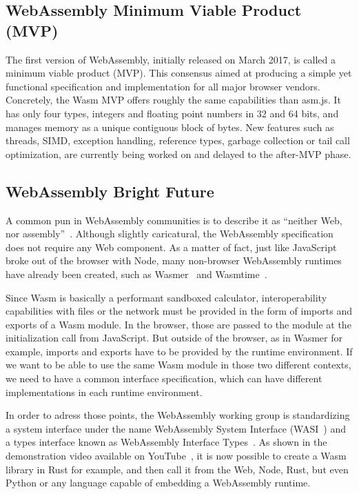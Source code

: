 \subsection{WebAssembly Minimum Viable Product (MVP)}%
\label{sub:wasm-mvp}

The first version of WebAssembly, initially released on March 2017,
is called a minimum viable product (MVP).
This consensus aimed at producing a simple yet functional specification and implementation
for all major browser vendors.
Concretely, the Wasm MVP offers roughly the same capabilities than asm.js.
It has only four types, integers and floating point numbers in 32 and 64 bits,
and manages memory as a unique contiguous block of bytes.
New features such as threads,
SIMD, exception handling, reference types, garbage collection or tail call optimization,
are currently being worked on and delayed to the after-MVP phase.

\subsection{WebAssembly Bright Future}%
\label{sub:wasm-future}

A common pun in WebAssembly communities is to describe it
as ``neither Web, nor assembly''~\cite{jayphelps2019wasm}.
Although slightly caricatural, the WebAssembly specification does not require any Web component.
As a matter of fact, just like JavaScript broke out of the browser with Node,
many non-browser WebAssembly runtimes have already been created, such as Wasmer~\cite{wasmer}
and Wasmtime~\cite{wasmtime}.

Since Wasm is basically a performant sandboxed calculator,
interoperability capabilities with files or the network
must be provided in the form of imports and exports of a Wasm module.
In the browser, those are passed to the module at the initialization call from JavaScript.
But outside of the browser, as in Wasmer for example,
imports and exports have to be provided by the runtime environment.
If we want to be able to use the same Wasm module in those two different contexts,
we need to have a common interface specification,
which can have different implementations in each runtime environment.

In order to adress those points, the WebAssembly working group
is standardizing a system interface under the name
WebAssembly System Interface (WASI~\cite{wasi}) and a types interface
known as WebAssembly Interface Types~\cite{wait}.
As shown in the demonstration video available on YouTube~\cite{waitvideo},
it is now possible to create a Wasm library in Rust for example,
and then call it from the Web, Node, Rust, but even Python or any language
capable of embedding a WebAssembly runtime.

